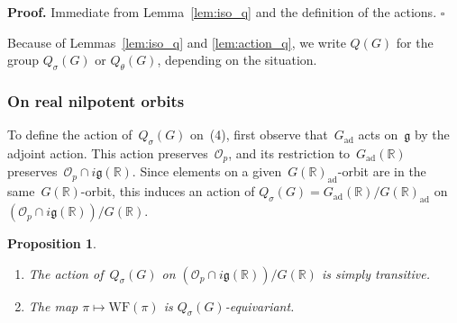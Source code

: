 \documentclass[10pt,leqno]{article}
\newtheorem{proposition}[equation]{Proposition}
\newcommand{\qed}{\hfill $\square$ \medskip}
\newenvironment{proof}[1][Proof]{\noindent\textbf{#1.} }{\qed}
\newcommand{\Gad}{G_\mathrm{ad}}
\renewcommand{\O}{\mathcal O}
\newcommand{\R}{\mathbb R}
\newcommand{\g}{\mathfrak g}
\newcommand{\WF}{\mathrm{WF}}
\newcommand{\Op}{\O_p}
\begin{document}
\begin{proof}
Immediate from Lemma~\ref{lem:iso_q} and the definition of the actions.
\end{proof}

Because of Lemmas~\ref{lem:iso_q} and \ref{lem:action_q}, we write $Q(G)$ for the group $Q_\sigma(G)$ or $Q_\theta(G)$, depending on the situation.



\subsubsection*{On real nilpotent orbits} 

To define the action of~$Q_{\sigma}(G)$ on~(4), first observe that~$\Gad$ acts on~$\g$ by the adjoint action. This action preserves~$\Op$, and its restriction to~$\Gad(\R)$ preserves~$\Op\cap i\g(\R)$. Since elements on a given~$G(\R)_{\mathrm{ad}}$-orbit are in the same~$G(\R)$-orbit, this induces an action of $Q_{\sigma}(G)=\Gad(\R)/G(\R)_{\mathrm{ad}}$ on~$(\Op\cap i\g(\R))/G(\R)$.

\begin{proposition}\label{prop:action_on_real_orbits}
\begin{enumerate} 
\item The action of~$Q_{\sigma}(G)$ on $(\Op\cap i\g(\R))/G(\R)$ is simply transitive.
\item The map $\pi \mapsto \WF(\pi)$ is $Q_{\sigma}(G)$-equivariant.
\end{enumerate}
\end{proposition}
\end{document}
